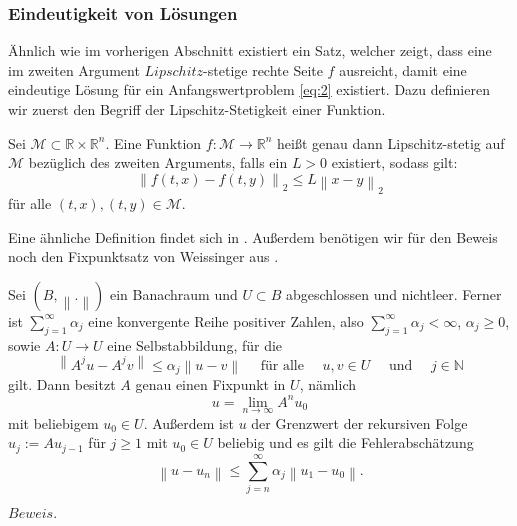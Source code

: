 \subsubsection{Eindeutigkeit von Lösungen}
Ähnlich wie im vorherigen Abschnitt existiert ein Satz, welcher zeigt, dass eine im zweiten Argument $Lipschitz$-stetige
rechte Seite $f$ ausreicht, damit eine eindeutige Lösung für ein Anfangswertproblem \eqref{eq:2} existiert. Dazu
definieren wir zuerst den Begriff der Lipschitz-Stetigkeit einer Funktion.
\begin{definition}
    Sei $\mathcal{M} \subset \mathbb{R} \times \mathbb{R}^{n}$. Eine Funktion $f: \mathcal{M} \rightarrow \mathbb{R}^n$
    heißt genau dann Lipschitz-stetig auf $\mathcal{M}$ bezüglich des zweiten Arguments, falls ein $L>0$ existiert,
    sodass gilt:
    \[
        \left\lVert f(t,x) - f(t,y) \right\rVert_2 \leq L \left\lVert x - y  \right\rVert_2
    \]
    für alle $(t,x), (t,y) \in \mathcal{M}$.
\end{definition}
Eine ähnliche Definition findet sich in \cite[36-37]{ernsthairergerhardwannerSolvingOrdinaryDifferential}. Außerdem
benötigen wir für den Beweis noch den Fixpunktsatz von Weissinger aus
\cite{harroheuserGewohnlicheDifferentialgleichungen}.
\begin{satz}
    \label{Fixpunktsatzvonweissinger}
    Sei $\left( B, \left\lVert . \right\rVert \right) $ ein Banachraum und $U \subset B$ abgeschlossen und nichtleer.
    Ferner ist $\sum_{j=1}^{\infty} \alpha_j$ eine konvergente Reihe positiver Zahlen, also \linebreak
    $\sum_{j=1}^{\infty} \alpha_j < \infty $, $\alpha_j \geq 0$, sowie $A:U \rightarrow U$ eine Selbstabbildung, für die
    \[
        \left\lVert A^{j}u - A^{j}v \right\rVert \leq \alpha_j \left\lVert u - v \right\rVert \quad \text{ für alle }
        \quad u,v \in U \quad \text{ und } \quad j \in \mathbb{N}
    \]
    gilt. Dann besitzt $A$ genau einen Fixpunkt in $U$, nämlich
    \[
        u = \lim_{n\rightarrow \infty} A^{n}u_0
    \]
    mit beliebigem $u_0 \in U$. Außerdem ist $u$ der Grenzwert der rekursiven Folge $u_j:=Au_{j-1}$ für $j \geq 1$
    mit $u_0 \in U$ beliebig und es gilt die Fehlerabschätzung
    \[
        \left\lVert u - u_n \right\rVert \leq \sum_{j=n}^{\infty} \alpha_j \left\lVert u_1 - u_0 \right\rVert.
    \]
\end{satz}
$Beweis.$ \cite[139]{harroheuserGewohnlicheDifferentialgleichungen}\\
